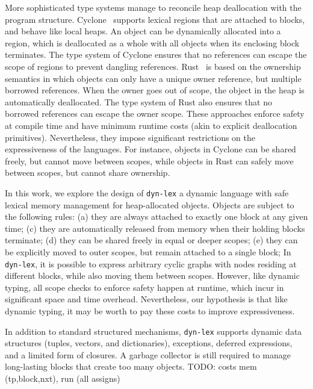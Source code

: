 \documentclass[12pt]{article}
\newcommand{\code}[1] {\texttt{\footnotesize{#1}}}
\newcommand{\lex} {\code{dyn-lex}\xspace}
\begin{document}
More sophisticated type systems manage to reconcile heap deallocation with the
program structure.
%
Cyclone~\cite{TODO} supports lexical regions that are attached to blocks, and
behave like local heaps.
An object can be dynamically allocated into a region, which is deallocated as a
whole with all objects when its enclosing block terminates.
The type system of Cyclone ensures that no references can escape the scope of
regions to prevent dangling references.
%
Rust~\cite{TODO} is based on the ownership semantics in which objects can only
have a unique owner reference, but multiple borrowed references.
When the owner goes out of scope, the object in the heap is automatically
deallocated.
The type system of Rust also ensures that no borrowed references can escape the
owner scope.
%
These approaches enforce safety at compile time and have minimum runtime costs
(akin to explicit deallocation primitives).
Nevertheless, they impose significant restrictions on the expressiveness of the
languages.
For instance, objects in Cyclone can be shared freely, but cannot move between
scopes, while objects in Rust can safely move between scopes, but cannot share
ownership.

In this work, we explore the design of \lex a dynamic language with safe
lexical memory management for heap-allocated objects.
%
Objects are subject to the following rules:
    (a) they are always attached to exactly one block at any given time;
    (c) they are automatically released from memory when their holding blocks
        terminate;
    (d) they can be shared freely in equal or deeper scopes;
    (e) they can be explicitly moved to outer scopes, but remain attached to a
        single block;
%
In \lex, it is possible to express arbitrary cyclic graphs with nodes residing
at different blocks, while also moving them between scopes.
%
However, like dynamic typing, all scope checks to enforce safety happen at
runtime, which incur in significant space and time overhead.
Nevertheless, our hypothesis is that like dynamic typing, it may be worth to
pay these costs to improve expressiveness.

In addition to standard structured mechanisms, \lex supports dynamic data
structures (tuples, vectors, and dictionaries), exceptions, deferred
expressions, and a limited form of closures.
%
A garbage collector is still required to manage long-lasting blocks that create
too many objects.
%
TODO: costs mem (tp,block,nxt), run (all assigns)
\end{document}
